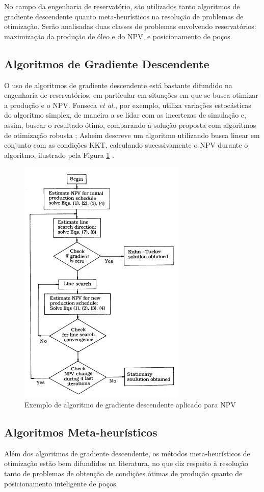 No campo da engenharia de reservatório, são utilizados tanto algoritmos de gradiente descendente quanto meta-heurísticos na resolução de problemas de otimização. Serão analisadas duas classes de problemas envolvendo reservatórios: maximização da produção de óleo e do NPV, e posicionamento de poços.
\nocite{EOR:Intro}


\subsection{Algoritmos de Gradiente Descendente}
O uso de algoritmos de gradiente descendente está bastante difundido na engenharia de reservatórios, em particular em situações em que se busca otimizar a produção e o NPV. Fonseca \textit{et al.}, por exemplo, utiliza variações estocásticas do algoritmo simplex, de maneira a se lidar com as incertezas de simulação e, assim, buscar o resultado ótimo, comparando a solução proposta com algoritmos de otimização robusta \cite{fonseca}; Asheim descreve um algoritmo utilizando busca linear em conjunto com as condições KKT, calculando sucessivamente o NPV durante o algoritmo, ilustrado pela Figura \ref{fig:asheim1} \cite{asheim88}.

\begin{figure}[H]
	\centering
	\includegraphics[width=.5\textwidth]{figs/revisao/revisao_asheim1}
	\caption{Exemplo de algoritmo de gradiente descendente aplicado para NPV \cite{asheim88}\label{fig:asheim1}}
\end{figure}

\subsection{Algoritmos Meta-heurísticos}
Além dos algoritmos de gradiente descendente, os métodos meta-heurísticos de otimização estão bem difundidos na literatura, no que diz respeito à resolução tanto de problemas de obtenção de condições ótimas de produção quanto de posicionamento inteligente de poços.